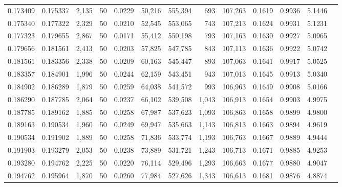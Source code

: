 \begin{tabular}{rrrrrrrrrrrrr}
0.173409 & 0.175337 & 2,135 &  50 &                                     0.0229 &  50,216 & 555,394 &     693 & 107,263 & 0.1619 & 0.9936 & 5.1446 \\
0.175340 & 0.177322 & 2,329 &  50 &                                     0.0210 &  52,545 & 553,065 &     743 & 107,213 & 0.1624 & 0.9931 & 5.1231 \\
0.177323 & 0.179655 & 2,867 &  50 &                                     0.0171 &  55,412 & 550,198 &     793 & 107,163 & 0.1630 & 0.9927 & 5.0965 \\
0.179656 & 0.181561 & 2,413 &  50 &                                     0.0203 &  57,825 & 547,785 &     843 & 107,113 & 0.1636 & 0.9922 & 5.0742 \\
0.181561 & 0.183356 & 2,338 &  50 &                                     0.0209 &  60,163 & 545,447 &     893 & 107,063 & 0.1641 & 0.9917 & 5.0525 \\
0.183357 & 0.184901 & 1,996 &  50 &                                     0.0244 &  62,159 & 543,451 &     943 & 107,013 & 0.1645 & 0.9913 & 5.0340 \\
0.184902 & 0.186289 & 1,879 &  50 &                                     0.0259 &  64,038 & 541,572 &     993 & 106,963 & 0.1649 & 0.9908 & 5.0166 \\
0.186290 & 0.187785 & 2,064 &  50 &                                     0.0237 &  66,102 & 539,508 &   1,043 & 106,913 & 0.1654 & 0.9903 & 4.9975 \\
0.187785 & 0.189162 & 1,885 &  50 &                                     0.0258 &  67,987 & 537,623 &   1,093 & 106,863 & 0.1658 & 0.9899 & 4.9800 \\
0.189163 & 0.190534 & 1,960 &  50 &                                     0.0249 &  69,947 & 535,663 &   1,143 & 106,813 & 0.1663 & 0.9894 & 4.9619 \\
0.190534 & 0.191902 & 1,889 &  50 &                                     0.0258 &  71,836 & 533,774 &   1,193 & 106,763 & 0.1667 & 0.9889 & 4.9444 \\
0.191903 & 0.193279 & 2,053 &  50 &                                     0.0238 &  73,889 & 531,721 &   1,243 & 106,713 & 0.1671 & 0.9885 & 4.9253 \\
0.193280 & 0.194762 & 2,225 &  50 &                                     0.0220 &  76,114 & 529,496 &   1,293 & 106,663 & 0.1677 & 0.9880 & 4.9047 \\
0.194762 & 0.195964 & 1,870 &  50 &                                     0.0260 &  77,984 & 527,626 &   1,343 & 106,613 & 0.1681 & 0.9876 & 4.8874 \\

\end{tabular}
